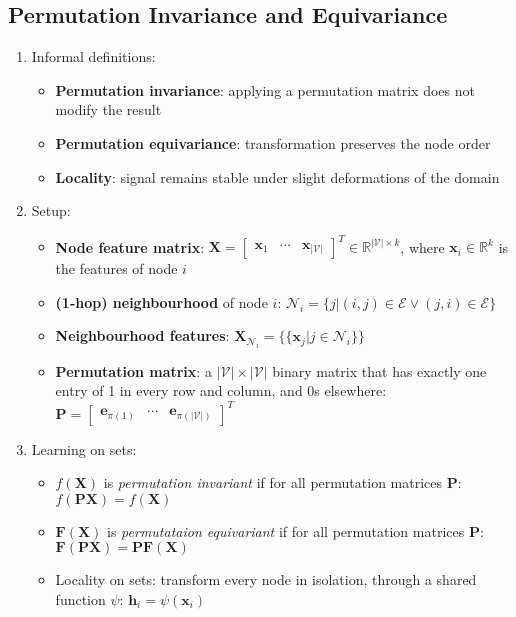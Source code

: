 \documentclass{article}
\begin{document}
\subsection{Permutation Invariance and Equivariance}

\begin{enumerate}
	\item Informal definitions:
	\begin{itemize}[topsep=0pt]
		\item \textbf{Permutation invariance}: applying a permutation matrix does not modify the result
		\item \textbf{Permutation equivariance}: transformation preserves the node order
		\item \textbf{Locality}: signal remains stable under slight deformations of the domain
	\end{itemize}

	\item Setup:
	\begin{itemize}[topsep=0pt]
		\item \textbf{Node feature matrix}: $\mathbf{X}=\begin{bmatrix}
			\mathbf{x}_1 & \cdots & \mathbf{x}_{|\mathcal{V}|}
		\end{bmatrix}^T\in\mathbb{R}^{|\mathcal{V}|\times k}$, where $\mathbf{x}_i\in\mathbb{R}^k$ is the features of node $i$
		\item \textbf{(1-hop) neighbourhood} of node $i$: $\mathcal{N}_i=\big\{j\big|(i,j)\in\mathcal{E}\vee(j,i)\in\mathcal{E}\big\}$
		\item \textbf{Neighbourhood features}: $\mathbf{X}_{\mathcal{N}_i}=\{\!\{\mathbf{x}_j|j\in\mathcal{N}_i\}\!\}$
		\item \textbf{Permutation matrix}: a $|\mathcal{V}|\times|\mathcal{V}|$ binary matrix that has exactly one entry of 1 in every row and column, and 0s elsewhere: $\mathbf{P}=\begin{bmatrix}
			\mathbf{e}_{\pi(1)} & \cdots & \mathbf{e}_{\pi(|\mathcal{V}|)}
		\end{bmatrix}^T$
	\end{itemize}

	\item Learning on sets:
	\begin{itemize}[topsep=0pt]
		\item $f(\mathbf{X})$ is \textit{permutation invariant} if for all permutation matrices $\mathbf{P}$: $f(\mathbf{PX})=f(\mathbf{X})$
		\item $\bm{F}(\mathbf{X})$ is \textit{permutataion equivariant} if for all permutation matrices $\mathbf{P}$: $\bm{F}(\mathbf{PX})=\mathbf{P}\bm{F}(\mathbf{X})$ 
		\item Locality on sets: transform every node in isolation, through a shared function $\psi$: $\mathbf{h}_i=\psi(\mathbf{x}_i)$
		

\end{itemize}
\end{enumerate}
\end{document}
